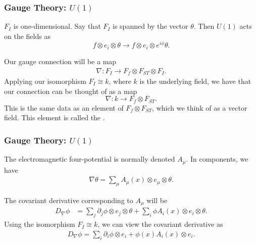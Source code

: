 \documentclass{beamer}
\begin{document}


\begin{frame}


\frametitle{Gauge Theory: $U(1)$}


 $F_I$ is one-dimensional. Say that $F_I$ is spanned by the vector $\theta$. Then $U(1)$ acts on the fields as
\begin{equation}
f \otimes e_i \otimes \theta \to f \otimes e_i \otimes e^{i \phi} \theta.
\end{equation}


 Our gauge connection will be a map 
\begin{align*}
\nabla: F_I \to F_f \otimes F_{ST} \otimes F_I.
\end{align*}
Applying our isomorphism $F_{I} \cong k$, where $k$ is the underlying field, we have that our connection can be thought of as a map
\begin{equation}
\nabla: k \to F_f \otimes F_{ST}.
\end{equation}
This is the same data as an element of $F_f \otimes F_{ST}$, which we think of as a vector field. This element is called the .


\end{frame}



\begin{frame}


\frametitle{Gauge Theory: $U(1)$}


 The electromagnetic four-potential is normally denoted $A_\mu$. In components, we have
\begin{align*}
\nabla \theta = \sum_\mu A_\mu(x) \otimes e_\mu \otimes \theta.
\end{align*}

 The covariant derivative corresponding to $A_\mu$ will be
\begin{align*}
D_\nabla \phi &= \sum_{j} \partial_j \phi \otimes e_j \otimes \theta + \sum_{i} \phi A_i(x) \otimes e_i \otimes \theta.
\end{align*}
Using the isomorphism $F_I \cong k$, we can view the covariant derivative as
\begin{align*}
D_\nabla \phi = \sum_{i} \partial_i \phi \otimes e_i + \phi(x) A_i(x) \otimes e_i.
\end{align*}
\end{frame}
\end{document}
